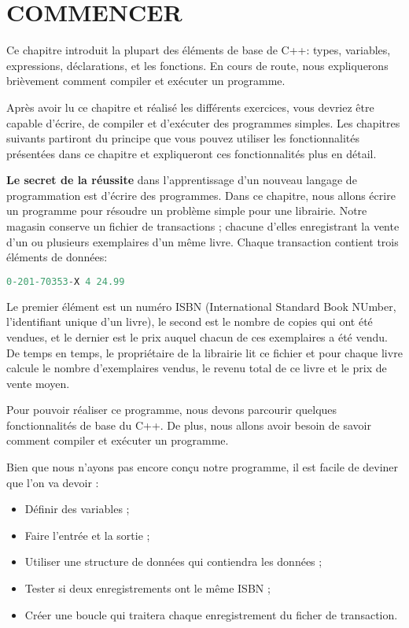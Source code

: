 \chapter{COMMENCER}

Ce chapitre introduit la plupart des éléments de base de C++: types, variables, expressions, déclarations, et les fonctions. En cours de route, nous expliquerons brièvement comment compiler et exécuter un programme.

Après avoir lu ce chapitre et réalisé les différents exercices, vous devriez être capable d'écrire, de compiler et d'exécuter des programmes simples. Les chapitres suivants partiront du principe que vous pouvez utiliser les fonctionnalités présentées dans ce chapitre et expliqueront ces fonctionnalités plus en détail.

\newpage
\textbf{Le secret de la réussite} dans l'apprentissage d'un nouveau langage de programmation est d'écrire des programmes. Dans ce chapitre, nous allons écrire un programme pour résoudre un problème simple pour une librairie. Notre magasin conserve un fichier de transactions ; chacune d'elles enregistrant la vente d'un ou plusieurs exemplaires d'un même livre. Chaque transaction contient trois éléments de données:

\medbreak
\begin{lstlisting}[language=C]
	0-201-70353-X 4 24.99
\end{lstlisting}
\medbreak
Le premier élément est un numéro ISBN (International Standard Book NUmber, l'identifiant unique d'un livre), le second est le nombre de copies qui ont été vendues, et le dernier est le prix auquel chacun de ces exemplaires a été vendu. De temps en temps, le propriétaire de la librairie lit ce fichier et pour chaque livre calcule le nombre d'exemplaires vendus, le revenu total de ce livre et le prix de vente moyen.

Pour pouvoir réaliser ce programme, nous devons parcourir quelques fonctionnalités de base du C++. De plus, nous allons avoir besoin de savoir comment compiler et exécuter un programme.

Bien que nous n'ayons pas encore conçu notre programme, il est facile de deviner que l'on va devoir :

\medbreak
\begin{itemize}
	\item[\textbullet] Définir des variables ;
	\item[\textbullet] Faire l'entrée et la sortie ;
	\item[\textbullet] Utiliser une structure de données qui contiendra les données ;
	\item[\textbullet] Tester si deux enregistrements ont le même ISBN ;
	\item[\textbullet] Créer une boucle qui traitera chaque enregistrement du ficher de transaction.
\end{itemize}
 
